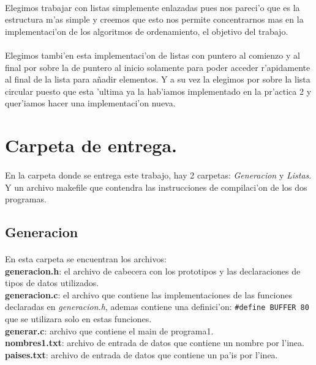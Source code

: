 \documentclass{article}
\begin{document}
	\paragraph{} 
	Elegimos trabajar con listas simplemente enlazadas pues nos pareci'o que es la estructura m'as simple y creemos que esto nos permite concentrarnos mas en la implementaci'on de los algoritmos de ordenamiento, el objetivo del trabajo.
	\paragraph{}
	Elegimos tambi'en esta implementaci'on de listas con puntero al comienzo y al final por sobre la de puntero al inicio solamente para poder acceder r'apidamente al final de la lista para añadir elementos. Y a su vez la elegimos por sobre la lista circular puesto que esta 'ultima ya la hab'iamos implementado en la pr'actica 2 y quer'iamos hacer una implementaci'on nueva.
	
	\pagebreak
	
	\section{Carpeta de entrega.}
	\paragraph{}
	En la carpeta donde se entrega este trabajo, hay 2 carpetas: \emph{Generacion} y \emph{Listas}. Y un archivo makefile que contendra las instrucciones de compilaci'on de los dos programas.
	
	\subsection{Generacion}
	\paragraph{}
	En esta carpeta se encuentran los archivos: \\ 
	\textbf{generacion.h}: el archivo de cabecera con los prototipos y las declaraciones de tipos de datos utilizados. \\
	\textbf{generacion.c}: el archivo que contiene las implementaciones de las funciones declaradas en \emph{generacion.h}, ademas contiene una definici'on: \lstinline|#define BUFFER 80| que se utilizara solo en estas funciones. \\
	\textbf{generar.c}: archivo que contiene el main de programa1. \\
	\textbf{nombres1.txt}: archivo de entrada de datos que contiene un nombre por l'inea.\\
	\textbf{paises.txt}: archivo de entrada de datos que contiene un pa'is por l'inea. 
\end{document}
